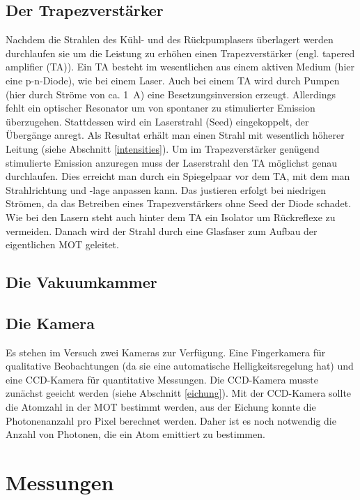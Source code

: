 \documentclass[12pt, a4paper]{article}
\begin{document}
  \subsection{Der Trapezverstärker}
    Nachdem die Strahlen des Kühl- und des Rückpumplasers überlagert werden durchlaufen
    sie um die Leistung zu erhöhen einen Trapezverstärker (engl. tapered amplifier
    (TA)). Ein TA besteht im wesentlichen aus einem aktiven Medium (hier eine
    p-n-Diode), wie bei einem Laser. Auch bei einem TA wird durch Pumpen (hier durch
    Ströme von ca. \SI{1}{\A}) eine Besetzungsinversion erzeugt. Allerdings fehlt ein
    optischer Resonator um von spontaner zu stimulierter Emission überzugehen.
    Stattdessen wird ein Laserstrahl (Seed) eingekoppelt, der Übergänge anregt. Als
    Resultat erhält man einen Strahl mit wesentlich höherer Leitung (siehe Abschnitt
    \ref{intensities}). Um im Trapezverstärker genügend stimulierte Emission anzuregen
    muss der Laserstrahl den TA möglichst genau durchlaufen. Dies erreicht man durch
    ein Spiegelpaar vor dem TA, mit dem man Strahlrichtung und -lage anpassen kann. Das
    justieren erfolgt bei niedrigen Strömen, da das Betreiben eines Trapezverstärkers
    ohne Seed der Diode schadet. Wie bei den Lasern steht auch hinter dem TA ein
    Isolator um Rückreflexe zu vermeiden. Danach wird der Strahl durch eine Glasfaser
    zum Aufbau der eigentlichen MOT geleitet.
  \subsection{Die Vakuumkammer}
    
  \subsection{Die Kamera}
    Es stehen im Versuch zwei Kameras zur Verfügung. Eine Fingerkamera für qualitative
    Beobachtungen (da sie eine automatische Helligkeitsregelung hat) und eine
    CCD-Kamera für quantitative Messungen. Die CCD-Kamera musste zunächst geeicht
    werden (siehe Abschnitt \ref{eichung}). Mit der CCD-Kamera sollte die Atomzahl in
    der MOT bestimmt werden, aus der Eichung konnte die Photonenanzahl pro Pixel
    berechnet werden. Daher ist es noch notwendig die Anzahl von Photonen, die ein Atom
    emittiert zu bestimmen. 
\newpage
\section{Messungen}
\end{document}
